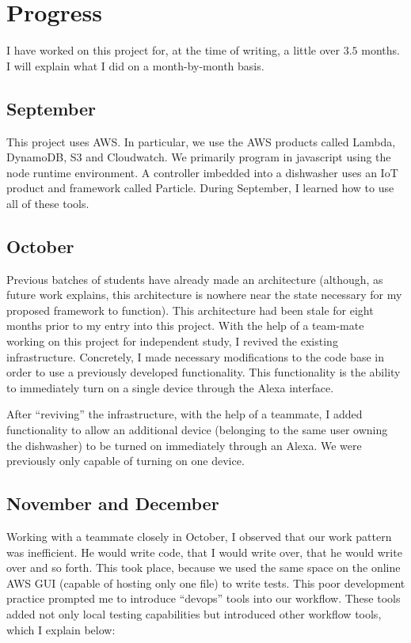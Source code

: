 \documentclass[a4paper]{article}
\begin{document}
\section{Progress}
I have worked on this project for, at the time of writing, a little over $3.5$ months. I will explain what I did on a month-by-month basis.

\subsection{September}
This project uses AWS. In particular, we use the AWS products called Lambda, DynamoDB, S3 and Cloudwatch. We primarily program in javascript using the node runtime environment. A controller imbedded into a dishwasher uses an IoT product and framework called Particle. During September, I learned how to use all of these tools.

\subsection{October}
Previous batches of students have already made an architecture (although, as future work explains, this architecture is nowhere near the state necessary for my proposed framework to function). This architecture had been stale for eight months prior to my entry into this project. With the help of a team-mate working on this project for independent study, I revived the existing infrastructure. Concretely, I made necessary modifications to the code base in order to use a previously developed functionality. This functionality is the ability to immediately turn on a single device through the Alexa interface.

After ``reviving'' the infrastructure, with the help of a teammate, I added functionality to allow an additional device (belonging to the same user owning the dishwasher) to be turned on immediately through an Alexa. We were previously only capable of turning on one device.

\subsection{November and December}
Working with a teammate closely in October, I observed that our work pattern was inefficient. He would write code, that I would write over, that he would write over and so forth. This took place, because we used the same space on the online AWS GUI (capable of hosting only one file) to write tests. This poor development practice prompted me to introduce ``devops'' tools into our workflow. These tools added not only local testing capabilities but introduced other workflow tools, which I explain below:
\end{document}
